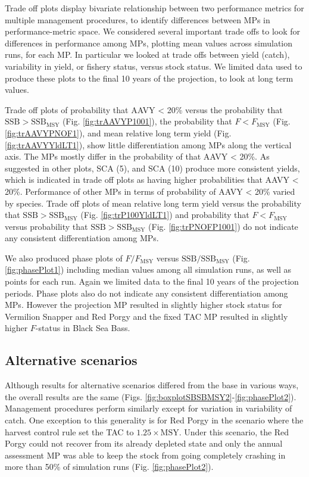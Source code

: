 \documentclass[12pt,english]{article}
\begin{document}
\begin{flushleft}
\begin{spacing}{1.9}
Trade off plots display bivariate relationship between two performance metrics for multiple management procedures, to identify differences between MPs in performance-metric space. We considered several important trade offs to look for differences in performance among MPs, plotting mean values across simulation runs, for each MP. In particular we looked at trade offs between yield (catch), variability in yield, or fishery status, versus stock status. We limited data used to produce these plots to the final 10 years of the projection, to look at long term values.

Trade off plots of probability that AAVY < 20\% versus the probability that $\mathrm{SSB>SSB_{MSY}}$ (Fig. \ref{fig:trAAVYP1001}), the probability that $F<F_{\mathrm{MSY}}$ (Fig. \ref{fig:trAAVYPNOF1}), and mean relative long term yield (Fig. \ref{fig:trAAVYYldLT1}), show little differentiation among MPs along the vertical axis. The MPs mostly differ in the probability of that AAVY < 20\%. As suggested in other plots, SCA (5), and SCA (10) produce more consistent yields, which is indicated in trade off plots as having higher probabilities that AAVY < 20\%. Performance of other MPs in terms of probability of AAVY < 20\% varied by species. Trade off plots of mean relative long term yield versus the probability that $\mathrm{SSB>SSB_{MSY}}$ (Fig. \ref{fig:trP100YldLT1}) and probability that $F<F_{\mathrm{MSY}}$ versus probability that $\mathrm{SSB>SSB_{MSY}}$ (Fig. \ref{fig:trPNOFP1001}) do not indicate any consistent differentiation among MPs.

We also produced phase plots of $F/F_{\mathrm{MSY}}$ versus $\mathrm{SSB/SSB_{MSY}}$ (Fig. \ref{fig:phasePlot1}) including median values among all simulation runs, as well as points for each run. Again we limited data to the final 10 years of the projection periods. Phase plots also do not indicate any consistent differentiation among MPs. However the projection MP resulted in slightly higher stock status for Vermilion Snapper and Red Porgy and the fixed TAC MP resulted in slightly higher $F$-status in Black Sea Bass.

\subsection*{Alternative scenarios}
Although results for alternative scenarios differed from the base in various ways, the overall results are the same (Figs. \ref{fig:boxplotSBSBMSY2}-\ref{fig:phasePlot2}). Management procedures perform similarly except for variation in variability of catch. One exception to this generality is for Red Porgy in the scenario where the harvest control rule set the TAC to $1.25\times\mathrm{MSY}$. Under this scenario, the Red Porgy could not recover from its already depleted state and only the annual assessment MP was able to keep the stock from going completely crashing in more than 50\% of simulation runs (Fig. \ref{fig:phasePlot2}).


\end{spacing}
\end{flushleft}
\end{document}
